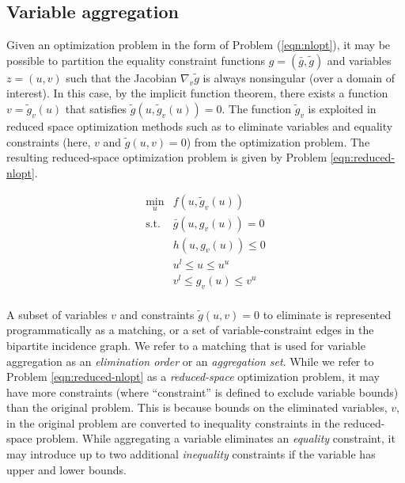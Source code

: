 \documentclass[smallextended]{svjour3}
\newcommand{\rev}[1]{{#1}}
\begin{document}
\subsection{Variable aggregation}
\label{sec:aggregation}
Given an optimization problem in the form of \rev{Problem} (\ref{eqn:nlopt}), it may be
possible to partition the equality constraint functions $g=(\bar g, \tilde g)$
and variables $z=(u, v)$ such that the Jacobian $\nabla_v \tilde g$ is always
nonsingular (over a domain of interest).
In this case, by the implicit function theorem, there exists a function
$v = \tilde g_v(u)$ that satisfies $\tilde g(u, \tilde g_v(u))=0$.
The function $\tilde g_v$ is exploited in reduced space optimization methods
such as \cite{parker2022,pacaud2022,pacaud2024} to eliminate
variables and equality constraints (here, $v$ and $\tilde g(u, v) = 0$) from the
optimization problem.
The resulting reduced-space optimization problem is given by \rev{Problem} \ref{eqn:reduced-nlopt}.

\begin{equation}
  \begin{array}{cl}
    \displaystyle\min_u & f(u, \tilde g_v(u)) \\
    \text{s.t.} & \bar g(u, g_v(u)) = 0 \\
    & h(u, g_v(u)) \leq 0 \\
    & u^l \leq u \leq u^u \\
    & v^l \leq g_v(u) \leq v^u \\
  \end{array}
  \label{eqn:reduced-nlopt}
\end{equation}

A subset of variables $v$ and constraints $\tilde g(u,v)=0$ to eliminate
is represented programmatically as a matching, or a set of variable-constraint
edges in the bipartite incidence graph. We refer to a matching that is used
for variable aggregation as an {\it elimination order} or an
{\it aggregation set}. While we refer to Problem \eqref{eqn:reduced-nlopt}
as a {\it reduced-space} optimization problem, it may have more constraints
(where ``constraint'' is defined to exclude variable bounds)
than the original problem. This is because bounds on the eliminated variables,
$v$, in the original problem are converted to inequality constraints in the
reduced-space problem. While aggregating a variable eliminates an
{\it equality} constraint, it may introduce up to two additional
{\it inequality} constraints if the variable has upper and lower bounds.
\end{document}
